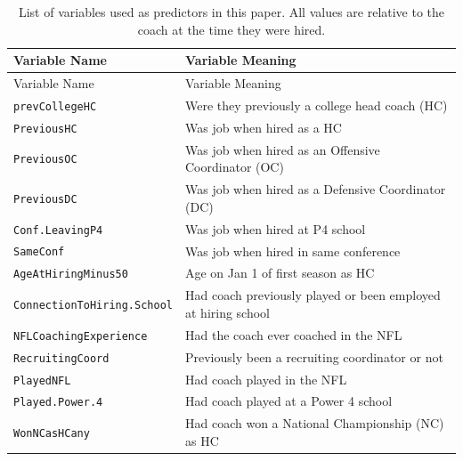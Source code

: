 \documentclass[
  12pt]{article}
\begin{document}
\begin{longtable}[]{@{}
  >{\raggedright\arraybackslash}p{}
  >{\raggedright\arraybackslash}p{}@{}}
\caption{List of variables used as predictors in this paper. All values
are relative to the coach at the time they were
hired.}\label{tbl-var}\tabularnewline
\toprule\noalign{}
\begin{minipage}[b]{\linewidth}\raggedright
Variable Name
\end{minipage} & \begin{minipage}[b]{\linewidth}\raggedright
Variable Meaning
\end{minipage} \\
\midrule\noalign{}
\endfirsthead
\toprule\noalign{}
\begin{minipage}[b]{\linewidth}\raggedright
Variable Name
\end{minipage} & \begin{minipage}[b]{\linewidth}\raggedright
Variable Meaning
\end{minipage} \\
\midrule\noalign{}
\endhead
\bottomrule\noalign{}
\endlastfoot
\texttt{prevCollegeHC} & Were they previously a college head coach
(HC) \\
\texttt{PreviousHC} & Was job when hired as a HC \\
\texttt{PreviousOC} & Was job when hired as an Offensive Coordinator
(OC) \\
\texttt{PreviousDC} & Was job when hired as a Defensive Coordinator
(DC) \\
\texttt{Conf.LeavingP4} & Was job when hired at P4 school \\
\texttt{SameConf} & Was job when hired in same conference \\
\texttt{AgeAtHiringMinus50} & Age on Jan 1 of first season as HC \\
\texttt{ConnectionToHiring.School} & Had coach previously played or been
employed at hiring school \\
\texttt{NFLCoachingExperience} & Had the coach ever coached in the
NFL \\
\texttt{RecruitingCoord} & Previously been a recruiting coordinator or
not \\
\texttt{PlayedNFL} & Had coach played in the NFL \\
\texttt{Played.Power.4} & Had coach played at a Power 4 school \\
\texttt{WonNCasHCany} & Had coach won a National Championship (NC) as HC

\end{longtable}
\end{document}
